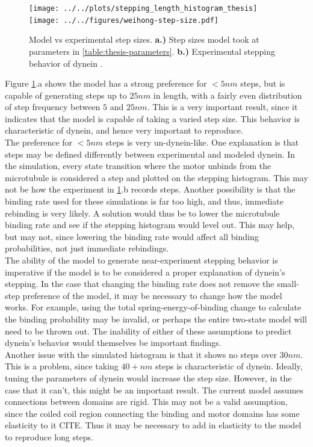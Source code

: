 \documentclass[
11pt, %
english, %
singlespacing, %
headsepline, %
chapterinoneline, %
]{MastersDoctoralThesis} %
\begin{document}
\begin{figure}[H]
  \centering
    \texttt{[image: ../../plots/stepping\_length\_histogram\_thesis]}%
    \texttt{[image: ../../figures/weihong-step-size.pdf]}
    \caption{Model vs experimental step sizes. \textbf{a.)} Step sizes model took at parameters in \ref{table:thesis-parameters}. \textbf{b.)} Experimental stepping behavior of dynein \cite{weihongpaper}.}
    \label{fig:final-histograms}
\end{figure}

Figure \ref{fig:final-histograms}.a shows the model has a strong preference for $<5nm$ steps, but is capable of generating steps up to $25nm$ in length, with a fairly even distribution of step frequency between $5$ and $25nm$. This is a very important result, since it indicates that the model is capable of taking a varied step size. This behavior is characteristic of dynein, and hence very important to reproduce.\\

The preference for $<5nm$ steps is very un-dynein-like. One explanation is that steps may be defined differently between experimental and modeled dynein. In the simulation, every state transition where the motor unbinds from the microtubule is considered a step and plotted on the stepping histogram. This may not be how the experiment in \ref{fig:final-histograms}.b records steps. Another possibility is that the binding rate used for these simulations is far too high, and thus, immediate rebinding is very likely. A solution would thus be to lower the microtubule binding rate and see if the stepping histogram would level out. This may help, but may not, since lowering the binding rate would affect all binding probabilities, not just immediate rebindings.\\

The ability of the model to generate near-experiment stepping behavior is imperative if the model is to be considered a proper explanation of dynein's stepping. In the case that changing the binding rate does not remove the small-step preference of the model, it may be necessary to change how the model works. For example, using the total spring-energy-of-binding change to calculate the binding probability may be invalid, or perhaps the entire two-state model will need to be thrown out. The inability of either of these assumptions to predict dynein's behavior would themselves be important findings.\\

Another issue with the simulated histogram is that it shows no steps over $30nm$. This is a problem, since taking $40+nm$ steps is characteristic of dynein. Ideally, tuning the parameters of dynein would increase the step size. However, in the case that it can't, this might be an important result. The current model assumes connections between domains are rigid. This may not be a valid assumption, since the coiled coil region connecting the binding and motor domains has some elasticity to it CITE. Thus it may be necessary to add in elasticity to the model to reproduce long steps.\\
\end{document}

